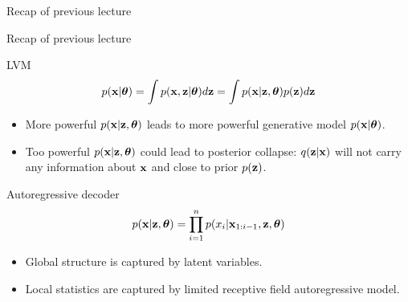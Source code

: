 \begin{frame}{Recap of previous lecture}
\begin{minipage}[t]{0.45\columnwidth}
\begin{figure}[h]
		\end{figure}
	\end{minipage}
	
\end{frame}
\begin{frame}{Recap of previous lecture}
	\begin{block}{LVM}
		\vspace{-0.3cm}
		\[
		    p(\mathbf{x} | \boldsymbol{\theta}) = \int p(\mathbf{x}, \mathbf{z} | \boldsymbol{\theta}) d \mathbf{z} = \int p(\mathbf{x} | \mathbf{z}, \boldsymbol{\theta}) p(\mathbf{z}) d \mathbf{z} 
		\]
		\vspace{-0.3cm}
	\end{block}
	\begin{itemize}
		\item More powerful $p(\mathbf{x} | \mathbf{z}, \boldsymbol{\theta})$ leads to more powerful generative model $p(\mathbf{x} | \boldsymbol{\theta})$.
		\item Too powerful $p(\mathbf{x} | \mathbf{z}, \boldsymbol{\theta})$ could lead to posterior collapse: $q(\mathbf{z} | \mathbf{x})$ will not carry any information about $\mathbf{x}$ and close to prior $p(\mathbf{z})$.
	\end{itemize}
	\begin{block}{Autoregressive decoder}
		\vspace{-0.2cm}
		\[
		    p(\mathbf{x} | \mathbf{z} , \boldsymbol{\theta}) = \prod_{i=1}^n p(x_i | \mathbf{x}_{1:i - 1}, \mathbf{z} , \boldsymbol{\theta})
		\]
	\end{block}
	\begin{itemize}
		\item Global structure is captured by latent variables.
		\item Local statistics are captured by limited receptive field autoregressive model.
	\end{itemize}
	
\end{frame}
